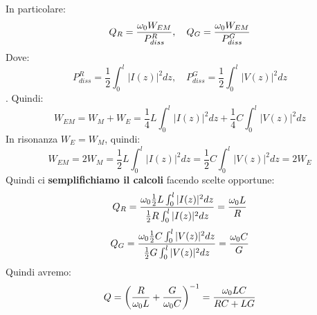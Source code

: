 In particolare:
\begin{equation*}
    Q_R = \frac{\omega_0 W_{EM}}{P^R_{diss}}, \quad Q_G = \frac{\omega_0 W_{EM}}{P^G_{diss}}
\end{equation*}
Dove:
\begin{equation*}
    P^R_{diss} = \frac{1}{2} \int_0^l |I(z)|^2 dz, \quad P^G_{diss} = \frac{1}{2} \int_0^l |V(z)|^2 dz
\end{equation*}.
Quindi:
\begin{equation*}
    W_{EM} = W_M + W_E = \frac{1}{4} L \int_0^l |I(z)|^2 dz + \frac{1}{4} C \int_0^l |V(z)|^2 dz
\end{equation*}
In risonanza $W_E = W_M$, quindi:
\begin{equation*}
    W_{EM} = 2W_M = \frac{1}{2} L \int_0^l |I(z)|^2 dz = \frac{1}{2} C \int_0^l |V(z)|^2 dz = 2W_E
\end{equation*}
Quindi ci\textbf{ semplifichiamo il calcoli} facendo scelte opportune:
\begin{equation*}
    Q_R = \frac{\omega_0 \frac{1}{2} L \int_0^l |I(z)|^2 dz}{\frac{1}{2} R \int_0^l |I(z)|^2 dz} = \frac{\omega_0 L}{R}
\end{equation*}
\begin{equation*}
    Q_G = \frac{\omega_0 \frac{1}{2} C \int_0^l |V(z)|^2 dz}{\frac{1}{2} G \int_0^l |V(z)|^2 dz} = \frac{\omega_0 C}{G}
\end{equation*}
Quindi avremo:
\begin{equation*}
    Q = \left(\frac{R}{\omega_0 L}  + \frac{G}{\omega_0 C}\right)^{-1} = \frac{\omega_0 LC}{R C + L G}
\end{equation*}

